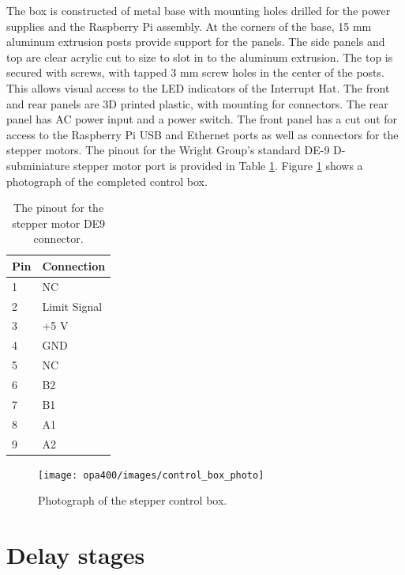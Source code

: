 The box is constructed of metal base with mounting holes drilled for the power supplies and the Raspberry Pi assembly.
At the corners of the base, 15 mm aluminum extrusion posts provide support for the panels.
The side panels and top are clear acrylic cut to size to slot in to the aluminum extrusion.
The top is secured with screws, with tapped 3 mm screw holes in the center of the posts.
This allows visual access to the LED indicators of the Interrupt Hat.
The front and rear panels are 3D printed plastic, with mounting for connectors.
The rear panel has AC power input and a power switch.
The front panel has a cut out for access to the Raspberry Pi USB and Ethernet ports as well as connectors for the stepper motors.
The pinout for the Wright Group's standard DE-9 D-subminiature stepper motor port is provided in Table \ref{opa4:tab:de9}.
Figure \ref{opa4:fig:control_box_photo} shows a photograph of the completed control box.

\begin{table}[]
\begin{tabular}{ll}
\hline
Pin & Connection   \\ \hline
1   & NC           \\
2   & Limit Signal \\
3   & +5 V         \\
4   & GND          \\
5   & NC           \\
6   & B2           \\
7   & B1           \\
8   & A1           \\
9   & A2           \\ \hline
\end{tabular}
	\caption[Stepper Motor DE9 Pinout]{The pinout for the stepper motor DE9 connector.}
	\label{opa4:tab:de9}
\end{table}

\begin{figure}
\texttt{[image: opa400/images/control\_box\_photo]}
\caption[Stepper Control Box]{
Photograph of the stepper control box.
}
\label{opa4:fig:control_box_photo}
\end{figure}


\section{Delay stages}  %

